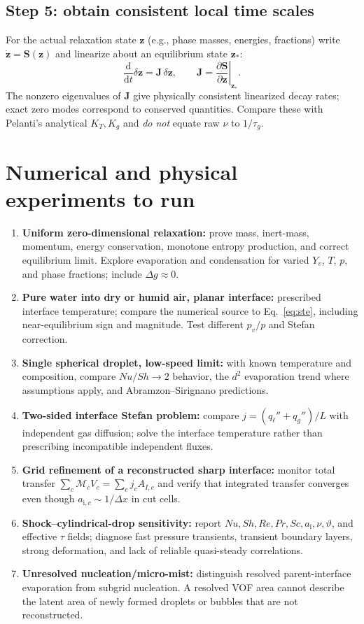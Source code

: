 \documentclass[11pt,letterpaper]{article}
\newcommand{\mi}{\mathrm{i}}
\newcommand{\dif}{\mathrm{d}}
\newcommand{\area}{a_\mi}
\newcommand{\mcal}{\mathcal{M}}
\begin{document}
\subsection{Step 5: obtain consistent local time scales}
For the actual relaxation state $\bm z$ (e.g., phase masses, energies, fractions) write $\dot{\bm z}=\bm S(\bm z)$ and linearize about an equilibrium state $\bm z_*$:
\begin{equation}\label{eq:jac}
\frac{\dif}{\dif t}\delta\bm z=\bm J\,\delta\bm z,\qquad
\bm J=\left.\frac{\partial\bm S}{\partial\bm z}\right|_{\bm z_*}.
\end{equation}
The nonzero eigenvalues of $\bm J$ give physically consistent linearized decay rates; exact zero modes correspond to conserved quantities. Compare these with Pelanti's analytical $K_T,K_g$ and \emph{do not} equate raw $\nu$ to $1/\tau_g$.

\section{Numerical and physical experiments to run}
\begin{enumerate}
\item \textbf{Uniform zero-dimensional relaxation:} prove mass, inert-mass, momentum, energy conservation, monotone entropy production, and correct equilibrium limit. Explore evaporation and condensation for varied $Y_v$, $T$, $p$, and phase fractions; include $\Delta g\approx0$.
\item \textbf{Pure water into dry or humid air, planar interface:} prescribed interface temperature; compare the numerical source to Eq.~\eqref{eq:ste}, including near-equilibrium sign and magnitude. Test different $p_v/p$ and Stefan correction.
\item \textbf{Single spherical droplet, low-speed limit:} with known temperature and composition, compare $Nu/Sh\to2$ behavior, the $d^2$ evaporation trend where assumptions apply, and Abramzon--Sirignano predictions.
\item \textbf{Two-sided interface Stefan problem:} compare $j=(q_\ell''+q_g'')/L$ with independent gas diffusion; solve the interface temperature rather than prescribing incompatible independent fluxes.
\item \textbf{Grid refinement of a reconstructed sharp interface:} monitor total transfer $\sum_c \mcal_c V_c=\sum_c j_c A_{I,c}$ and verify that integrated transfer converges even though $a_{\mi,c}\sim1/\Delta x$ in cut cells.
\item \textbf{Shock--cylindrical-drop sensitivity:} report $Nu,Sh,Re,Pr,Sc,\area,\nu,\vartheta$, and effective $\tau$ fields; diagnose fast pressure transients, transient boundary layers, strong deformation, and lack of reliable quasi-steady correlations.
\item \textbf{Unresolved nucleation/micro-mist:} distinguish resolved parent-interface evaporation from subgrid nucleation. A resolved VOF area cannot describe the latent area of newly formed droplets or bubbles that are not reconstructed.
\end{enumerate}
\end{document}
